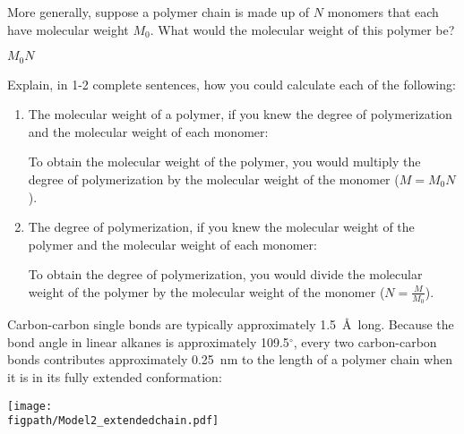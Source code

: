 \begin{activity}
\begin{ctqs}
	\question More generally, suppose a polymer chain is made up of $N$ monomers that each have molecular weight $M_0$.  What would the molecular weight of this polymer be?
	
		\begin{solution}[1in]
			$M_0 N$
		\end{solution}
	
	\question Explain, in 1-2 complete sentences, how you could calculate each of the following:
	
		\begin{enumerate}
			\item The molecular weight of a polymer, if you knew the degree of polymerization and the molecular weight of each monomer:
	
		\begin{solution}[1.75in]
			To obtain the molecular weight of the polymer, you would multiply the degree of polymerization by the molecular weight of the monomer ($M = M_0 N$).
		\end{solution}
			
			\item The degree of polymerization, if you knew the molecular weight of the polymer and the molecular weight of each monomer:
	
		\begin{solution}[1.75in]
			To obtain the degree of polymerization, you would divide the molecular weight of the polymer by the molecular weight of the monomer ($N = \frac{M}{M_0}$).
		\end{solution}
		
		\end{enumerate}
	
\end{ctqs}



\begin{model}
	\label{\labelbase:mdl:polyethylenesize}
	
	Carbon-carbon single bonds are typically approximately 1.5~\AA\ long.  Because the bond angle in linear alkanes is approximately 109.5${}^\circ$, every two carbon-carbon bonds contributes approximately 0.25~nm to the length of a polymer chain when it is in its fully extended conformation:
	
	\vspace{6pt}
	\centerline{\texttt{[image: \\figpath/Model2\_extendedchain.pdf]}}

\end{model}


\end{activity}
